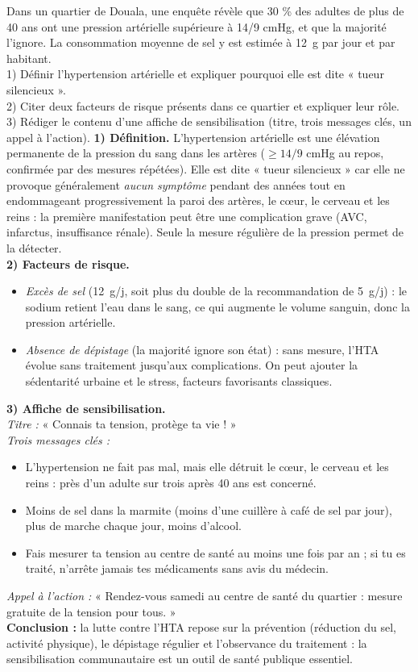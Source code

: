 \documentclass[11pt]{article}
\begin{document}
\begin{exoresolu}
Dans un quartier de Douala, une enquête révèle que 30 \% des adultes de plus de 40 ans ont une pression artérielle supérieure à 14/9 cmHg, et que la majorité l'ignore. La consommation moyenne de sel y est estimée à \SI{12}{g} par jour et par habitant.\\
1) Définir l'hypertension artérielle et expliquer pourquoi elle est dite « tueur silencieux ».\\
2) Citer deux facteurs de risque présents dans ce quartier et expliquer leur rôle.\\
3) Rédiger le contenu d'une affiche de sensibilisation (titre, trois messages clés, un appel à l'action).
\tcblower
\textbf{1) Définition.} L'hypertension artérielle est une élévation permanente de la pression du sang dans les artères ($\geq 14/9$ cmHg au repos, confirmée par des mesures répétées). Elle est dite « tueur silencieux » car elle ne provoque généralement \emph{aucun symptôme} pendant des années tout en endommageant progressivement la paroi des artères, le c\oe ur, le cerveau et les reins : la première manifestation peut être une complication grave (AVC, infarctus, insuffisance rénale). Seule la mesure régulière de la pression permet de la détecter.\\[2mm]
\textbf{2) Facteurs de risque.}
\begin{itemize}
\item \emph{Excès de sel} (\SI{12}{g/j}, soit plus du double de la recommandation de \SI{5}{g/j}) : le sodium retient l'eau dans le sang, ce qui augmente le volume sanguin, donc la pression artérielle.
\item \emph{Absence de dépistage} (la majorité ignore son état) : sans mesure, l'HTA évolue sans traitement jusqu'aux complications. On peut ajouter la sédentarité urbaine et le stress, facteurs favorisants classiques.
\end{itemize}
\textbf{3) Affiche de sensibilisation.}\\
\emph{Titre :} « Connais ta tension, protège ta vie ! »\\
\emph{Trois messages clés :}
\begin{itemize}
\item L'hypertension ne fait pas mal, mais elle détruit le c\oe ur, le cerveau et les reins : près d'un adulte sur trois après 40 ans est concerné.
\item Moins de sel dans la marmite (moins d'une cuillère à café de sel par jour), plus de marche chaque jour, moins d'alcool.
\item Fais mesurer ta tension au centre de santé au moins une fois par an ; si tu es traité, n'arrête jamais tes médicaments sans avis du médecin.
\end{itemize}
\emph{Appel à l'action :} « Rendez-vous samedi au centre de santé du quartier : mesure gratuite de la tension pour tous. »\\
\textbf{Conclusion :} la lutte contre l'HTA repose sur la prévention (réduction du sel, activité physique), le dépistage régulier et l'observance du traitement : la sensibilisation communautaire est un outil de santé publique essentiel.
\end{exoresolu}
\end{document}
